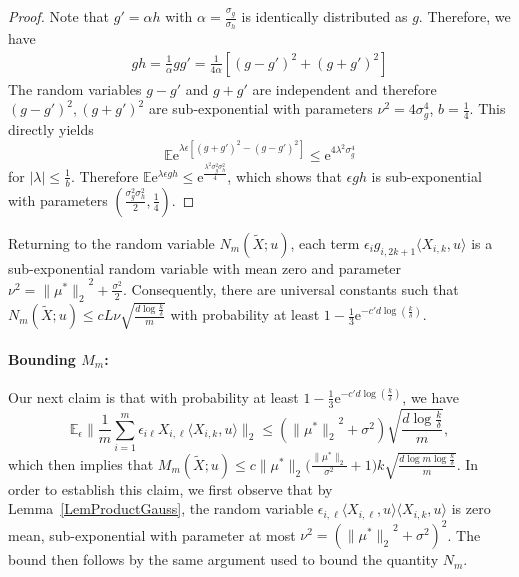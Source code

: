 \documentclass[twoside,11pt]{article}
\def\EE{ \mathbb{E} }
\def\E{ \mathrm{e} }							%
\newcommand{\norm}[1]{\ensuremath{\|#1\|_2}}
\newcommand{\paramobs}{\mu}
\newcommand{\trueparamobs}{\ensuremath{\paramobs^*}}
\newcommand{\kdim}{\ensuremath{k}}
\newcommand{\Xtil}{\ensuremath{\widetilde{X}}}
\newcommand{\lipcont}{\ensuremath{L}}
\newcommand{\processradM}{\ensuremath{M_m}}
\newcommand{\processradN}{\ensuremath{N_m}}
\begin{document}
\begin{proof}
Note that $g' = \alpha h$ with $\alpha = \frac{\sigma_g}{\sigma_h}$ is
identically distributed as $g$. Therefore, we have
\begin{align*}
g h = \frac{1}{\alpha} g g' = \frac{1}{4 \alpha}[(g-g')^2+ (g+g')^2]
\end{align*}
The random variables $g-g'$ and $g+g'$ are independent and therefore
$(g-g')^2, (g+g')^2$ are sub-exponential with parameters $\nu^2 =
4\sigma_g^4$, $b=\frac{1}{4}$. This directly yields
\begin{equation*}
\EE \E^{\lambda \epsilon [(g+g')^2 - (g-g')^2]} \leq \E^{4 \lambda^2 \sigma_g^4} 
\end{equation*}
for $|\lambda|\leq \frac{1}{b}$. Therefore $\EE \E^{\lambda \epsilon
  gh} \leq \E^{\frac{\lambda^2 \sigma_g^2 \sigma_h^2}{4}}$, which
shows that $\epsilon g h$ is sub-exponential with parameters
$(\frac{\sigma_g^2\sigma_h^2}{2}, \frac{1}{4})$.
\end{proof}
%

Returning to the random variable $\processradN(\Xtil;u)$, each term
$\epsilon_i g_{i,2k+1} \langle X_{i,k},u\rangle$ is a sub-exponential
random variable with mean zero and parameter $\nu^2 =
\norm{\trueparamobs}^2 + \frac{\sigma^2}{2}$.  Consequently, there are
universal constants such that $\processradN(\Xtil;u) \leq c
\lipcont\nu\sqrt{\frac{d \log \frac{\kdim}{\delta}}{m}}$ with probability
at least $1- \frac{1}{3}\E^{-c'd \log(\frac{\kdim}{\delta})}$.


\paragraph{Bounding $\processradM$:}
Our next claim is that with probability at least
$1-\frac{1}{3}\E^{-c'd \log(\frac{\kdim}{\delta})}$, we
have
\begin{equation}
\label{EqnTerm4}
\EE_{\epsilon} \norm{\frac{1}{m}\sum_{i=1}^m \epsilon_{i\ell}
  X_{i,\ell} \langle X_{i,k},u\rangle} \leq (\norm{\trueparamobs}^2 +
\sigma^2)\sqrt{\frac{ d \log \frac{k}{\delta}}{m}},
\end{equation}
which then implies that $\processradM(\Xtil;u) \leq c
\norm{\trueparamobs}\big(\frac{\norm{\trueparamobs}}{\sigma^2}+1\big)
k \sqrt{\frac{ d \log m \log \frac{k}{\delta}}{m}}$.  In order to
establish this claim, we first observe that by
Lemma~\ref{LemProductGauss}, the random variable $\epsilon_{i,\ell}
\langle X_{i,\ell}, u\rangle\langle X_{i,k}, u\rangle$ is zero mean,
sub-exponential with parameter at most $\nu^2 =
(\norm{\trueparamobs}^2 + \sigma^2)^2$.  The bound then follows by the
same argument used to bound the quantity $\processradN$.
\end{document}
